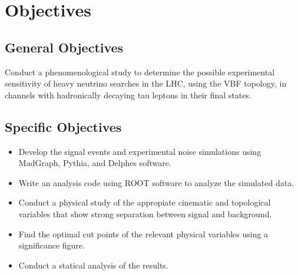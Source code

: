 \chapter{Objectives}
\section{General Objectives}

Conduct a phenomenological study to determine the possible experimental sensitivity of heavy neutrino searches in the LHC, using the VBF topology, in channels with hadronically decaying tau leptons in their final states.

\section{Specific Objectives}

\begin{itemize}
	\item Develop the signal events and experimental noise simulations using MadGraph, Pythia, and Delphes software.
	\item Write an analysis code using ROOT software to analyze the simulated data.
	\item Conduct a physical study of the appropiate cinematic and topological variables that show strong separation between signal and background.
	\item Find the optimal cut points of the relevant physical variables using a significance figure.
    \item Conduct a statical analysis of the results.
\end{itemize}

